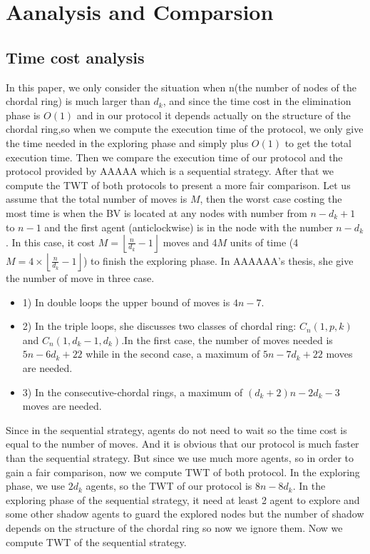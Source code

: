 \documentclass[conference]{IEEEtran}
\begin{document}
\section{Aanalysis and Comparsion}
\subsection{Time cost analysis}
In this paper, we only consider the situation when n(the number of nodes of the chordal ring) is much larger than $d_k$, and since the time cost in the elimination phase is $O(1)$ and in our protocol it depends actually on the structure of the chordal ring,so when we compute the execution time of the protocol, we only give the time needed in the exploring phase and simply plus $O(1)$ to get the total execution time. Then we compare the execution time of our protocol and the protocol provided by AAAAA which is a sequential strategy. After that we compute the TWT of both protocols to present a more fair comparison.
Let us assume that the total number of moves is $M$, then the worst case costing the most time is when the BV is located at any nodes with number from $n-d_k+1$ to $n-1$ and the first agent (anticlockwise) is in the node with the number $n-d_k$. In this case, it cost $M=\left \lfloor \frac{n}{d_k}-1\right \rfloor$ moves and 4$M$ units of time (4$M=4\times \left \lfloor \frac{n}{d_k}-1\right \rfloor$) to finish the exploring phase. 
In AAAAAA's thesis, she give the number of move in three case.
\begin{itemize}
\item 1) In double loops the upper bound of moves is $4n-7$.
\item 2) In the triple loops, she discusses two classes of chordal ring: $C_n(1,p,k)$ and $C_n(1,d_k-1,d_k)$.In the first case, the number of moves needed is $5n-6d_k+22$ while in the second case, a maximum of $5n-7d_k+22$ moves are needed.
\item 3) In the consecutive-chordal rings, a maximum of $(d_k+2)n-2d_k-3$ moves are needed.
\end{itemize}
Since in the sequential strategy, agents do not need to wait so the time cost is equal to the number of moves. And it is obvious that our protocol is much faster than the sequential strategy. But since we use much more agents, so in order to gain a fair comparison, now we compute TWT of both protocol.
In the exploring phase, we use $2d_k$ agents, so the TWT of our protocol is $8n-8d_k$. In the exploring phase of the sequential strategy, it need at least 2 agent to explore and some other shadow agents to guard the explored nodes but the number of shadow depends on the structure of the chordal ring so now we ignore them. Now we compute TWT of the sequential strategy.
\end{document}
